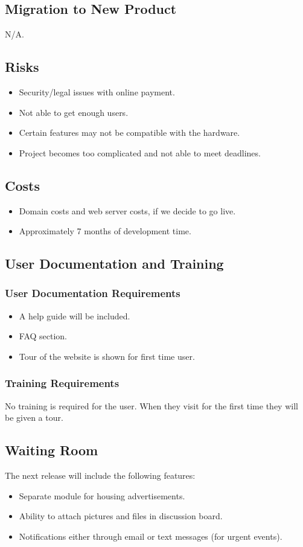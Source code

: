 \documentclass[12pt]{article}
\begin{document}
{\subsection{Migration to New Product}
N/A.

\subsection{Risks}
\begin{itemize}
  \item Security/legal issues with online payment.
  \item Not able to get enough users.
  \item Certain features may not be compatible with the hardware.
  \item Project becomes too complicated and not able to meet deadlines.
\end{itemize}
\subsection{Costs}
\begin{itemize}
  \item Domain costs and web server costs, if we decide to go live.
  \item Approximately 7 months of development time.
\end{itemize}
\subsection{User Documentation and Training}
\subsubsection{User Documentation Requirements}
\begin{itemize}
  \item A help guide will be included.
  \item FAQ section.
  \item Tour of the website is shown for first time user.
\end{itemize}
\subsubsection{Training Requirements}
No training is required for the user. When they visit for the first time they 
will be given a tour. 
\subsection{Waiting Room}
The next release will include the following features:
\begin{itemize}
	\item Separate module for housing advertisements.
	\item Ability to attach pictures and files in discussion board.
	\item Notifications either through email or text messages (for urgent events).
\end{itemize}
}
\end{document}
